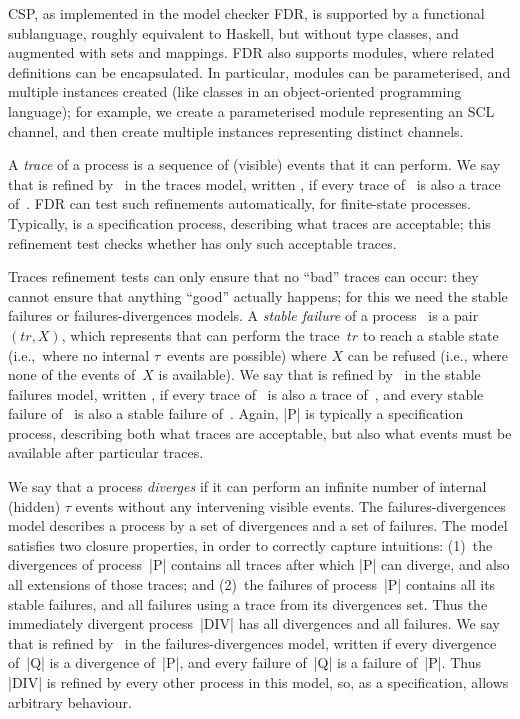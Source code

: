 CSP, as implemented in the model checker FDR, is supported by a functional
sublanguage, roughly equivalent to Haskell, but without type classes, and
augmented with sets and mappings.  FDR also supports modules, where related
definitions can be encapsulated.  In particular, modules can be parameterised,
and multiple instances created (like classes in an object-oriented programming
language); for example, we create a parameterised module representing an SCL
channel, and then create multiple instances representing distinct channels. 
 
A \emph{trace} of a process is a sequence of (visible) events that it
can perform.  We say that  is refined by~ in the traces model,
written \CSPM{P [T= Q}, if every trace of~ is also a trace
of~\@.  FDR can test such refinements automatically, for finite-state
processes.  Typically,  is a specification process, describing what
traces are acceptable; this refinement test checks whether  has only such
acceptable traces.  

Traces refinement tests can only ensure that no ``bad'' traces can occur: they
cannot ensure that anything ``good'' actually happens; for this we need the
stable failures or failures-divergences models.  A \emph{stable failure} of a
process~ is a pair $(tr,X)$, which represents that  can
perform the trace~$tr$ to reach a stable state (i.e.,~where no internal
$\tau$~events are possible) where $X$ can be refused (i.e., where none of the
events of~$X$ is available).  We say that  is refined by~ in
the stable failures model, written \CSPM{P [F= Q}, if every trace of~
is also a trace of~, and every stable failure of~ is also a
stable failure of~.  Again, |P| is typically a specification process,
describing both what traces are acceptable, but also what events must be
available after particular traces.

We say that a process \emph{diverges} if it can perform an infinite number of
internal (hidden) $\tau$ events without any intervening visible events.  The
failures-divergences model describes a process by a set of divergences and a
set of failures.  The model satisfies two closure properties, in order to
correctly capture intuitions: (1)~the divergences of process~|P|
contains all traces after which |P| can diverge, and also all extensions of
those traces; and (2)~the failures of process~|P| contains all its stable
failures, and all failures using a trace from its divergences set.  Thus the
immediately divergent process~|DIV| has all divergences and all failures.  We
say that  is refined by~ in the failures-divergences model,
written \CSPM{P [FD= Q}
if every divergence of~|Q| is a divergence of~|P|, and every failure of~|Q| is
a failure of~|P|.  Thus |DIV| is refined by every other process in this model,
so, as a specification, allows arbitrary behaviour.


